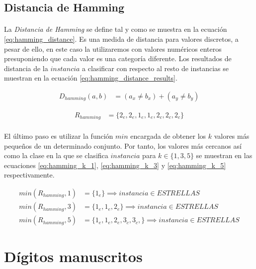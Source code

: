 \documentclass{article}
\begin{document}
		\subsection{Distancia de Hamming}
		\label{sec:hamming}

			\paragraph{}
			La \emph{Distancia de Hamming} se define tal y como se muestra en la ecuación \eqref{eq:hamming_distance}. Es una medida de distancia para valores discretos, a pesar de ello, en este caso la utilizaremos con valores numéricos enteros presuponiendo que cada valor es una categoría diferente. Los resultados de distancia de la $instancia$ a clasificar con respecto al resto de instancias se muestran en la ecuación \eqref{eq:hamming_distance_results}.


			\begin{align}
			\label{eq:hamming_distance}
				D_{hamming}(a,b) &= (a_x \neq b_x) + (a_y \neq b_y)
			\end{align}

			\begin{align}
			\label{eq:hamming_distance_results}
				R_{hamming} &= \{2_e, 2_e, 1_e, 1_e, 2_c, 2_c, 2_c\}
			\end{align}

			\paragraph{}
			El último paso es utilizar la función $min$ encargada de obtener los $k$ valores más pequeños de un determinado conjunto. Por tanto, los valores más cercanos así como la clase en la que se clasifica $instancia$ para $k \in \{1,3,5\}$ se muestran en las ecuaciones \eqref{eq:hamming_k_1}, \eqref{eq:hamming_k_3} y \eqref{eq:hamming_k_5} respectivamente.

			\begin{align}
			\label{eq:hamming_k_1}
				min(R_{hamming},1) &= \{ 1_e \}  \implies instancia \in ESTRELLAS \\
			\label{eq:hamming_k_3}
				min(R_{hamming},3) &= \{ 1_e, 1_e, 2_e\}  \implies instancia \in ESTRELLAS \\
			\label{eq:hamming_k_5}
				min(R_{hamming},5) &= \{ 1_e, 1_e, 2_e, 3_c, 3_c, \}  \implies instancia \in ESTRELLAS
			\end{align}

	\section{Dígitos manuscritos}
	\label{sec:e2}
\end{document}
